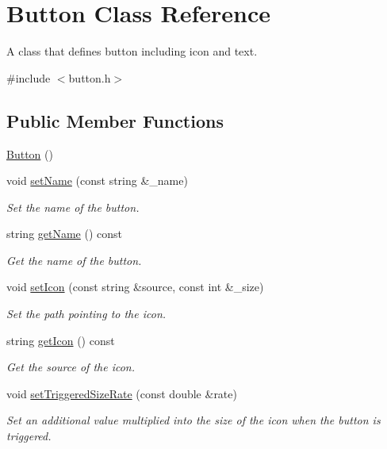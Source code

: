 \hypertarget{class_button}{}\section{Button Class Reference}
\label{class_button}


A class that defines button including icon and text.  




{\ttfamily \#include $<$button.\+h$>$}

\subsection*{Public Member Functions}
\begin{DoxyCompactItemize}
\item 
\mbox{\hyperlink{class_button_a3b36df1ae23c58aedb9e15a713159459}{Button}} ()
\item 
void \mbox{\hyperlink{class_button_ae9ffe01e228623458eedef88ccb42dc6}{set\+Name}} (const string \&\+\_\+name)
\begin{DoxyCompactList}\small\item\em Set the name of the button. \end{DoxyCompactList}\item 
string \mbox{\hyperlink{class_button_aebcf5fd7a9807c0f3416546dba5c37bf}{get\+Name}} () const
\begin{DoxyCompactList}\small\item\em Get the name of the button. \end{DoxyCompactList}\item 
void \mbox{\hyperlink{class_button_ac6bc8c6df116a4e24b32cc5ce9903704}{set\+Icon}} (const string \&source, const int \&\+\_\+size)
\begin{DoxyCompactList}\small\item\em Set the path pointing to the icon. \end{DoxyCompactList}\item 
string \mbox{\hyperlink{class_button_a17552602296d94d95e3cc91bce3f4aad}{get\+Icon}} () const
\begin{DoxyCompactList}\small\item\em Get the source of the icon. \end{DoxyCompactList}\item 
void \mbox{\hyperlink{class_button_a632e041a4c2f31df0930b6024ffa7f3e}{set\+Triggered\+Size\+Rate}} (const double \&rate)
\begin{DoxyCompactList}\small\item\em Set an additional value multiplied into the size of the icon when the button is triggered. \end{DoxyCompactList}\item 

\end{DoxyCompactItemize}
